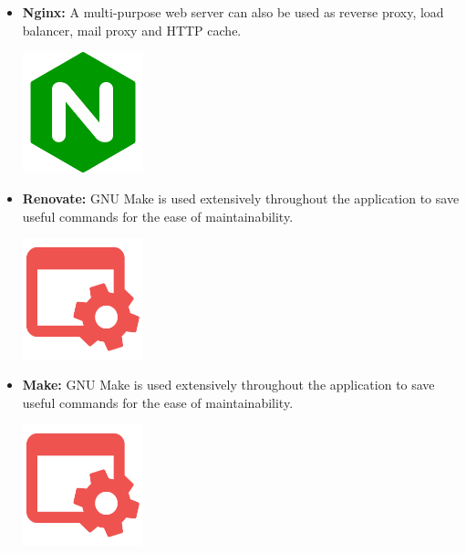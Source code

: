 \begin{itemize}
          \newpage
    \item \textbf{Nginx:} \newline A multi-purpose web server can also be used as reverse proxy, load balancer, mail proxy and HTTP cache. \newline
          \begin{minipage}{\linewidth}
              \centering
              \includegraphics[width=3.5cm]{src/assets/logos/nginx_512x512.png}
          \end{minipage}
    \item \textbf{Renovate:} \newline GNU Make is used extensively throughout the application to save useful commands for the ease of maintainability. \newline
          \begin{minipage}{\linewidth}
              \centering
              \includegraphics[width=3.5cm]{src/assets/logos/makefile_512x512.png}
          \end{minipage}
    \item \textbf{Make:} \newline GNU Make is used extensively throughout the application to save useful commands for the ease of maintainability. \newline
          \begin{minipage}{\linewidth}
              \centering
              \includegraphics[width=3.5cm]{src/assets/logos/makefile_512x512.png}
          \end{minipage}

          \newpage
\end{itemize}

